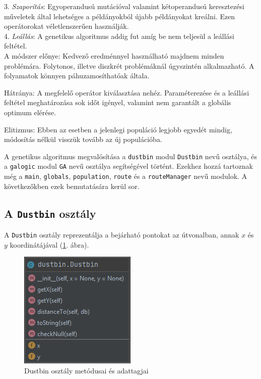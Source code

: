 3. \textit{Szaporítás}: Egyoperandusú mutációval valamint kétoperandusú keresztezési műveletek által lehetséges a példányokból újabb példányokat kreálni. Ezen operátorokat véletlenszerűen használják. \\

4. \textit{Leállás}: A genetikus algoritmus addig fut amíg be nem teljesül a leállási feltétel.\\

A módszer előnye: Kedvező eredménnyel használható majdnem minden problémára. Folytonos, illetve diszkrét problémáknál úgyszintén alkalmazható. A folyamatok könnyen páhuzamosíthatóak általa.

Hátránya: A megfelelő operátor kiválasztása nehéz. Paraméterezése és a leállási feltétel meghatározása sok időt igényel, valamint nem garantált a globális optimum elérése.

Elitizmus: Ebben az esetben a jelenlegi populáció legjobb egyedét mindig, módosítás nélkül visszük tovább az új populációba.


A genetikus algoritmus megvalósítása a \texttt{dustbin} modul \texttt{Dustbin} nevű osztálya, és a \texttt{galogic} modul \texttt{GA} nevű osztálya segítségével történt.
Ezekhez hozzá tartoznak még a \texttt{main}, \texttt{globals}, \texttt{population}, \texttt{route} és a \texttt{routeManager} nevű modulok.
A következőkben ezek bemutatására kerül sor.

\subsection{A \texttt{Dustbin} osztály}

A \texttt{Dustbin} osztály reprezentálja a bejárható pontokat az útvonalban, annak $x$ és $y$ koordinátájával (\ref{fig:dustbin}. ábra).

\begin{figure}[!htb]
\centering
\includegraphics[scale=0.7]{images/dustbin.png}
\caption{Dustbin osztály metódusai és adattagjai}
\label{fig:dustbin}
\end{figure}

